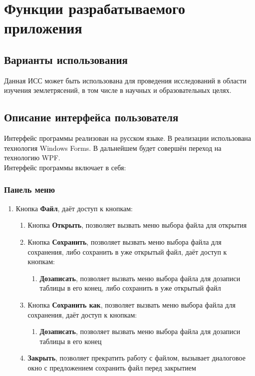 \documentclass[a4paper,12pt, fleqn]{article}
\theoremstyle{plain} %
\theoremstyle{definition} %
\theoremstyle{remark} %
\numberwithin{equation}{section}
\begin{document}
\section{Функции разрабатываемого приложения}

\subsection{Варианты использования}
Данная ИСС может быть использована для проведения исследований в области изучения землетрясений, в том числе в научных и образовательных целях.

\subsection{Описание интерфейса пользователя}
Интерфейс программы реализован на русском языке. В реализации использована технология Windows Forms. В дальнейшем будет совершён переход на технологию WPF.\\
Интерфейс программы включает в себя:
\subsubsection{Панель меню}
\begin{enumerate}
	\item Кнопка \textbf{Файл}, даёт доступ к кнопкам:
	\begin{enumerate}
		\item Кнопка \textbf{Открыть}, позволяет вызвать меню выбора файла для открытия
		\item Кнопка \textbf{Сохранить}, позволяет вызвать меню выбора файла для сохранения, либо сохранить в уже открытый файл, даёт доступ к кнопкам:
		\begin{enumerate}
			\item \textbf{Дозаписать}, позволяет вызвать меню выбора файла для дозаписи таблицы в его конец, либо сохранить в уже открытый файл
		\end{enumerate}
		\item Кнопка \textbf{Сохранить как}, позволяет вызвать меню выбора файла для сохранения, даёт доступ к кнопкам:
		\begin{enumerate}
			\item \textbf{Дозаписать}, позволяет вызвать меню выбора файла для дозаписи таблицы в его конец
		\end{enumerate}
		\item \textbf{Закрыть}, позволяет прекратить работу с файлом, вызывает диалоговое окно с предложением сохранить файл перед закрытием				
	\end{enumerate}
\end{enumerate}
\end{document}
